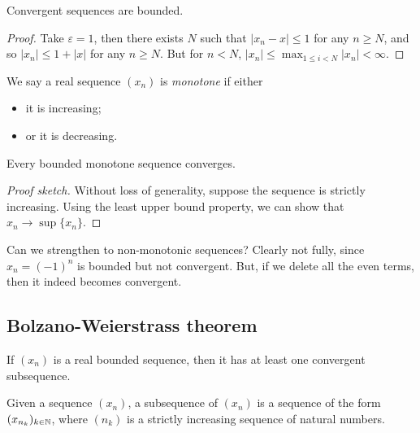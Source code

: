 \documentclass{../../template/note}
\begin{document}
    \begin{lemma}
        \label{convergent-bounded}
        Convergent sequences are bounded.
    \end{lemma}
    
    \begin{proof}
        Take \(\varepsilon = 1\), then there exists \(N\) such that \(|x_n - x| \leq 1\) for any \(n \geq N\), and so \(|x_n| \leq 1 + |x|\) for any \(n \geq N\). But for \(n < N\), \(|x_n| \leq \max_{1 \leq i < N}|x_n| < \infty\).
    \end{proof}
    
    \begin{definition}
        We say a real sequence \((x_n)\) is \emph{monotone} if either
        \begin{itemize}
            \item it is increasing;
            \item or it is decreasing.
        \end{itemize}
    \end{definition}
    
    \begin{proposition}
        \label{monotone-convergence}
        Every bounded monotone sequence converges.
    \end{proposition}
    
    \begin{proof}[Proof sketch]
        Without loss of generality, suppose the sequence is strictly increasing. Using the least upper bound property, we can show that \(x_n \to \sup\{x_n\}\).
    \end{proof}
    
    Can we strengthen to non-monotonic sequences? Clearly not fully, since \(x_n = (-1)^n\) is bounded but not convergent. But, if we delete all the even terms, then it indeed becomes convergent.
    
    \subsection{Bolzano-Weierstrass theorem}

    \begin{theorem}
        \label{bw}
        If \((x_n)\) is a real bounded sequence, then it has at least one convergent subsequence.
    \end{theorem}
    
    \begin{definition}[Subsequences]
        Given a sequence \((x_n)\), a subsequence of \((x_n)\) is a sequence of the form \((x_{n_k})_{k \in \mathbb N}\), where \((n_k)\) is a strictly increasing sequence of natural numbers.
    \end{definition}
    
\end{document}
